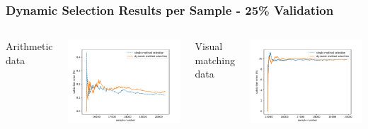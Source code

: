 \documentclass{beamer}
\begin{document}
\begin{frame}
\frametitle{Dynamic Selection Results per Sample - 25\% Validation}
\begin{columns}[c]
\begin{center}
Arithmetic data
\end{center}
\includegraphics[width=\textwidth]{switching/nata/0.25/nata25}

\begin{center}
Visual matching data
\end{center}
\includegraphics[width=\textwidth]{switching/vismatch/0.25/vismatch25}


\end{columns}
\end{frame}
\end{document}
